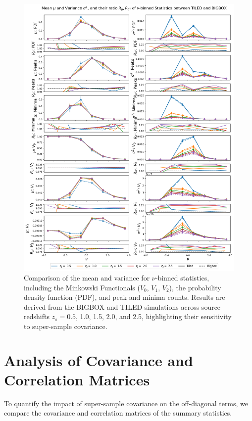 \begin{figure}[p]
    \centering
    \includegraphics[width=\textwidth]{figures/results/nu_main.png}
    \caption[Comparison of Mean and Variance for Non-Correlation Statistics]
    {Comparison of the mean and variance for $\nu$-binned statistics, including the Minkowski Functionals ($V_0$, $V_1$, $V_2$), the probability density function (PDF), and peak and minima counts. Results are derived from the BIGBOX and TILED simulations across source redshifts $z_s = 0.5$, 1.0, 1.5, 2.0, and 2.5, highlighting their sensitivity to super-sample covariance.}
    \label{fig:nu_main}
\end{figure}

\clearpage

\section{Analysis of Covariance and Correlation Matrices}
To quantify the impact of super-sample covariance on the off-diagonal terms, we compare the covariance and correlation matrices of the summary statistics.

